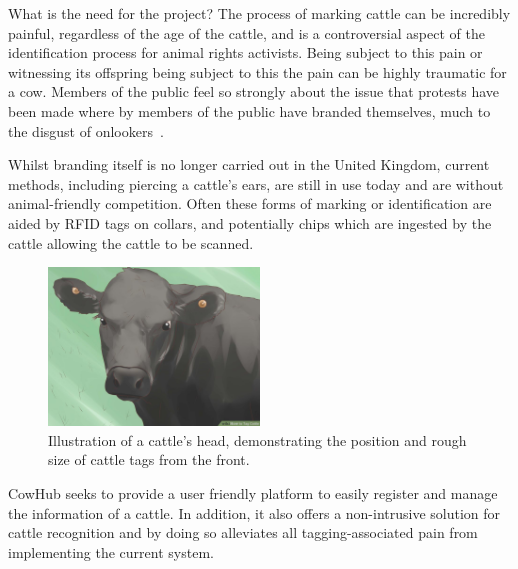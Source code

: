 
\begin{subsection}{What is the need for the project?}
  The process of marking cattle can be incredibly painful, regardless of the age of the cattle, and is a controversial aspect of the identification process for animal rights activists. Being subject to this pain or witnessing its offspring being subject to this the pain can be highly traumatic for a cow. Members of the public feel so strongly about the issue that protests have been made where by members of the public have branded themselves, much to the disgust of onlookers~\cite{theguardian1}.

  Whilst branding itself is no longer carried out in the United Kingdom, current methods, including piercing a cattle's ears, are still in use today and are without animal-friendly competition. Often these forms of marking or identification are aided by RFID tags on collars, and potentially chips which are ingested by the cattle allowing the cattle to be scanned.

  \begin{figure}[H]
  	\centering
    \includegraphics[width=0.5\textwidth]{images/cattle-with-ear-tag.jpg}
  	\caption[Cattle ear tagging]{
      Illustration of a cattle's head, demonstrating the position and rough size of cattle tags from the front. \cite{wikihow1}
  	}
  \end{figure}

  CowHub seeks to provide a user friendly platform to easily register and manage the information of a cattle. In addition, it also offers a non-intrusive solution for cattle recognition and by doing so alleviates all tagging-associated pain from implementing the current system.

\end{subsection}
